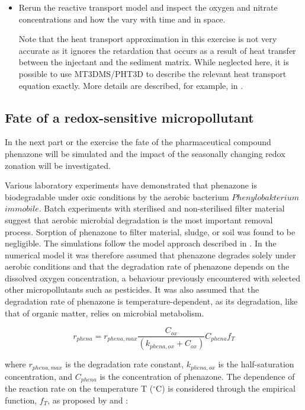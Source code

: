 \begin{itemize}
\item Rerun the reactive transport model and inspect 
the oxygen and nitrate concentrations and how the vary with time and in space.

Note that the heat transport approximation in this exercise is not very accurate
as it ignores the retardation that occurs as a result of heat transfer between
the injectant and the sediment matrix. 
While neglected here, it is possible to use MT3DMS/PHT3D to describe 
the relevant heat transport equation exactly. 
More details are described, for example, in \cite{seibert_2014}.   

\end{itemize}

\subsection[Fate of a redox-sensitive micropollutant]{Fate of a redox-sensitive micropollutant}

In the next part or the exercise the fate of the pharmaceutical compound 
phenazone will be simulated and the impact of the seasonally 
changing redox zonation will be investigated. 

Various laboratory experiments
have demonstrated that phenazone is biodegradable under
oxic conditions \citep{phdzuelke} by the aerobic 
bacterium $Phenylobakterium$ $immobile$. 
Batch experiments with sterilised
and non-sterilised filter material suggest that aerobic microbial
degradation is the most important removal process.
Sorption of phenazone to filter material, sludge, or soil was
found to be negligible. 
The simulations follow the model approach described in \cite{greskowiak_2006}. 
In the numerical model it was
therefore assumed that phenazone degrades solely under
aerobic conditions and that the degradation rate of
phenazone depends on the dissolved oxygen concentration, a behaviour
previously encountered with selected other micropollutants such as 
pesticides. It was also assumed that the degradation
rate of phenazone is temperature-dependent, as its degradation,
like that of organic matter, relies on microbial metabolism.

\begin{equation}
{r_{phena} = r_{phena,max} {\frac{C_{ox}}{(k_{phena,ox} + C_{ox})}} C_{phena} f_T }
\label{eq:phenazone_deg}
\end{equation}

where $r_{phena,max}$ is the degradation rate constant,
$k_{phena,ox}$ is the half-saturation concentration, 
and $C_{phena}$ is the concentration of phenazone. 
The dependence  of the reaction rate 
on the temperature T ($^{\circ}$C) is considered through 
the empirical function, $f_T$, as proposed by \cite{oconnel_1990} 
and \cite{kirschbaum_1995}:


